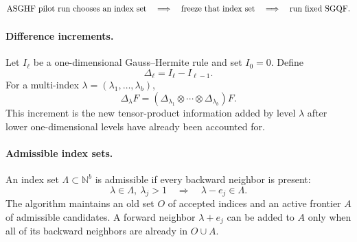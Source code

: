 \[
  \hbox{ASGHF pilot run chooses an index set}
  \quad\Longrightarrow\quad
  \hbox{freeze that index set}
  \quad\Longrightarrow\quad
  \hbox{run fixed SGQF.}
\]

\paragraph{Difference increments.}
Let \(I_\ell\) be a one-dimensional Gauss--Hermite rule and set \(I_0=0\).
Define
\[
  \Delta_\ell=I_\ell-I_{\ell-1}.
\]
For a multi-index \(\lambda=(\lambda_1,\ldots,\lambda_b)\),
\[
  \Delta_\lambda F
  =
  (\Delta_{\lambda_1}\otimes\cdots\otimes\Delta_{\lambda_b})F .
\]
This increment is the new tensor-product information added by level
\(\lambda\) after lower one-dimensional levels have already been accounted for.

\paragraph{Admissible index sets.}
An index set \(\Lambda\subset\mathbb N^b\) is admissible if every backward
neighbor is present:
\[
  \lambda\in\Lambda,\ \lambda_j>1
  \quad\Longrightarrow\quad
  \lambda-e_j\in\Lambda .
\]
The algorithm maintains an old set \(O\) of accepted indices and an active
frontier \(A\) of admissible candidates.  A forward neighbor \(\lambda+e_j\)
can be added to \(A\) only when all of its backward neighbors are already in
\(O\cup A\).

